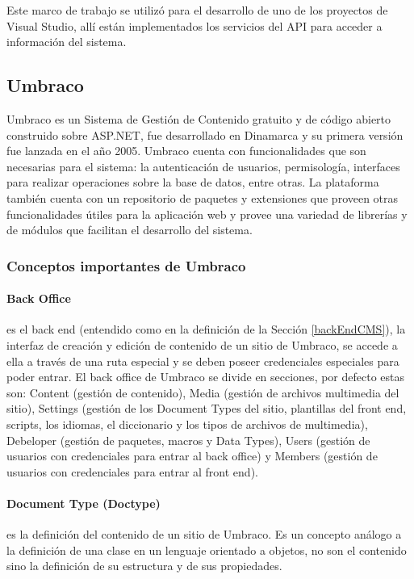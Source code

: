     Este marco de trabajo se utilizó para el desarrollo de uno de los proyectos de Visual Studio, allí están implementados los servicios del API para acceder a información del sistema.

    \subsection{Umbraco}
    Umbraco \cite{umbraco} es un Sistema de Gestión de Contenido gratuito y de código abierto construido sobre ASP.NET, fue desarrollado en Dinamarca y su primera versión fue lanzada en el año 2005. Umbraco cuenta con funcionalidades que son necesarias para el sistema: la autenticación de usuarios, permisología, interfaces para realizar operaciones sobre la base de datos, entre otras. La plataforma también cuenta con un repositorio de paquetes y extensiones que proveen otras funcionalidades útiles para la aplicación web y provee una variedad de librerías y de módulos que facilitan el desarrollo del sistema.

    \subsubsection{Conceptos importantes de Umbraco} \label{conceptosUmbraco}
    \paragraph{Back Office} es el back end (entendido como en la definición de la Sección \ref{backEndCMS}), la interfaz de creación y edición de contenido de un sitio de Umbraco, se accede a ella a través de una ruta especial y se deben poseer credenciales especiales para poder entrar. El back office de Umbraco se divide en secciones, por defecto estas son: Content (gestión de contenido), Media (gestión de archivos multimedia del sitio), Settings (gestión de los Document Types del sitio, plantillas del front end, scripts, los idiomas, el diccionario y los tipos de archivos de multimedia), Debeloper (gestión de paquetes, macros y Data Types), Users (gestión de usuarios con credenciales para entrar al back office) y Members (gestión de usuarios con credenciales para entrar al front end).
    \paragraph{Document Type (Doctype)} es la definición del contenido de un sitio de Umbraco. Es un concepto análogo a la definición de una clase en un lenguaje orientado a objetos, no son el contenido sino la definición de su estructura y de sus propiedades.
